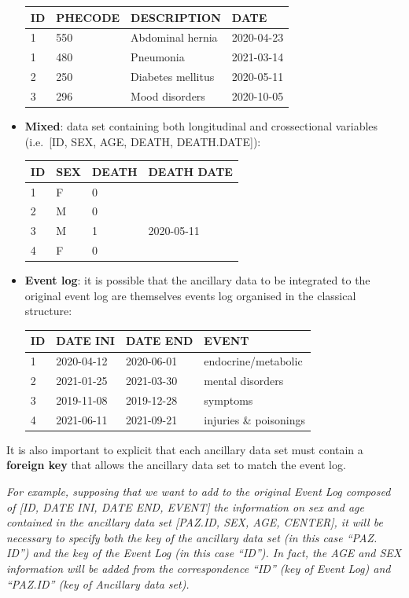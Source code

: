 \documentclass[
]{book}
\begin{document}
\begin{itemize}
  \begin{longtable}[]{@{}llll@{}}
  \toprule
  ID & PHECODE & DESCRIPTION & DATE \\
  \midrule
  \endhead
  1 & 550 & Abdominal hernia & 2020-04-23 \\
  1 & 480 & Pneumonia & 2021-03-14 \\
  2 & 250 & Diabetes mellitus & 2020-05-11 \\
  3 & 296 & Mood disorders & 2020-10-05 \\
  \bottomrule
  \end{longtable}
\item
  \textbf{Mixed}: data set containing both longitudinal and crossectional variables (i.e.~{[}ID, SEX, AGE, DEATH, DEATH.DATE{]}):

  \begin{longtable}[]{@{}llll@{}}
  \toprule
  ID & SEX & DEATH & DEATH DATE \\
  \midrule
  \endhead
  1 & F & 0 & \\
  2 & M & 0 & \\
  3 & M & 1 & 2020-05-11 \\
  4 & F & 0 & \\
  \bottomrule
  \end{longtable}
\item
  \textbf{Event log}: it is possible that the ancillary data to be integrated to the original event log are themselves events log organised in the classical structure:

  \begin{longtable}[]{@{}llll@{}}
  \toprule
  ID & DATE INI & DATE END & EVENT \\
  \midrule
  \endhead
  1 & 2020-04-12 & 2020-06-01 & endocrine/metabolic \\
  2 & 2021-01-25 & 2021-03-30 & mental disorders \\
  3 & 2019-11-08 & 2019-12-28 & symptoms \\
  4 & 2021-06-11 & 2021-09-21 & injuries \& poisonings \\
  \bottomrule
  \end{longtable}
\end{itemize}

It is also important to explicit that each ancillary data set must contain a \textbf{foreign key} that allows the ancillary data set to match the event log.

\emph{For example, supposing that we want to add to the original Event Log composed of {[}ID, DATE INI, DATE END, EVENT{]} the information on sex and age contained in the ancillary data set {[}PAZ.ID, SEX, AGE, CENTER{]}, it will be necessary to specify both the key of the ancillary data set (in this case ``PAZ. ID'') and the key of the Event Log (in this case ``ID''). In fact, the AGE and SEX information will be added from the correspondence ``ID'' (key of Event Log) and ``PAZ.ID'' (key of Ancillary data set).}
\end{document}
